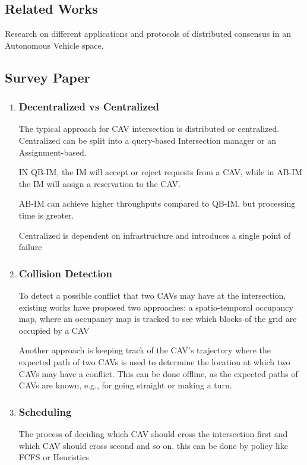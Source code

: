 \documentclass[fleqn,10pt]{olplainarticle}
\begin{document}
\subsection*{Related Works}

Research on different applications and protocols of distributed consensus in an Autonomous Vehicle space. 

\subsection{Survey Paper}

\begin{enumerate}


\item
\subsubsection{Decentralized vs Centralized }
The typical approach for CAV intersection is distributed or centralized. Centralized can be split into a query-based Intersection manager or an Assignment-based. 

IN QB-IM, the IM will accept or reject requests from a CAV, while in AB-IM the IM will assign a reservation to the CAV. 

AB-IM can achieve higher throughputs compared to QB-IM, but processing time is greater.

Centralized is dependent on infrastructure and introduces a single point of failure 

\item

\subsubsection{Collision Detection}
To detect a possible conflict that two CAVs may have at the intersection, existing works have proposed two approaches: 
a spatio-temporal occupancy map, where an occupancy map is tracked to see which blocks of the grid are occupied by a CAV

Another approach is keeping track of the CAV's trajectory where the expected path of two CAVs is used to determine the location at which two CAVs may have a conflict. This can be done offline, as the expected paths of CAVs are known, e.g., for going straight or making a turn.

\item

\subsubsection{Scheduling }
The process of deciding which CAV should cross the intersection first and which CAV should cross second and so on. this can be done by policy like FCFS or Heuristics


\end{enumerate}
\end{document}
